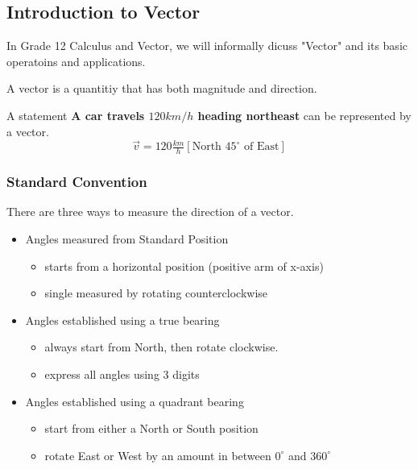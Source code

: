 \subsection{Introduction to Vector}
In Grade 12 Calculus and Vector, we will informally dicuss "Vector" and its basic operatoins and applications.
\begin{theorem}
    [Vector] A vector is a quantitiy that has both magnitude and direction. 
\end{theorem} 
\begin{example}
    A statement \textbf{A car travels $120km/h$ heading northeast} can be represented by a vector. 
    \begin{equation*}
        \vec{v} = 120\tfrac{km}{h}\left [ \text{North $45^{\circ}$ of East}\right ]
    \end{equation*}
\end{example}

\subsubsection{Standard Convention}
There are three ways to measure the direction of a vector.
\begin{itemize}
    \item Angles measured from Standard Position
    \begin{itemize}
        \item starts from a horizontal position (positive arm of x-axis)
        \item single measured by rotating counterclockwise
    \end{itemize}
    \item Angles established using a true bearing
    \begin{itemize}
        \item always start from North, then rotate clockwise. 
        \item express all angles using 3 digits
    \end{itemize}
    \item Angles established using a quadrant bearing
    \begin{itemize}
        \item start from either a North or South position
        \item rotate East or West by an amount in between $0^{\circ}$ and $360^{\circ}$
    \end{itemize}
\end{itemize}

